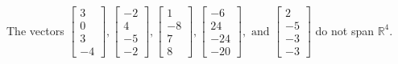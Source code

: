 \begin{exercise}
\begin{exerciseStatement}
  \end{exerciseStatement}
  \begin{exerciseAnswer}
   The vectors \(\left[\begin{array}{r}
3 \\
0 \\
3 \\
-4
\end{array}\right] , \left[\begin{array}{r}
-2 \\
4 \\
-5 \\
-2
\end{array}\right] , \left[\begin{array}{r}
1 \\
-8 \\
7 \\
8
\end{array}\right] , \left[\begin{array}{r}
-6 \\
24 \\
-24 \\
-20
\end{array}\right] , \text{ and } \left[\begin{array}{r}
2 \\
-5 \\
-3 \\
-3
\end{array}\right]\) 
  	 do not  
	span \(\mathbb{R}^4\).
  


  \end{exerciseAnswer}
\end{exercise}